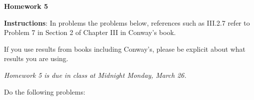 \documentclass{article}%
\begin{document}
\begin{center}

\textbf{Homework 5}\bigskip

\end{center}



\noindent\textbf{Instructions}:
\noindent In problems the problems below, references such as III.2.7 refer to Problem 7 in Section 2 of Chapter III in Conway's book.\smallskip



\noindent If you use results from books including Conway's, please be explicit about what results you are using.






\begin{center}

\emph{Homework 5 is due in class at Midnight Monday, March 26.}

\end{center} 

\medskip

Do the following problems:
\end{document}
